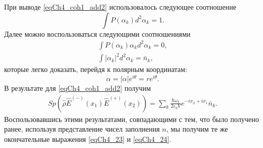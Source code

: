 При выводе \eqref{eqCh4_coh1_add2} использовалось следующее
соотношение
\[
\int 
P\left(\alpha_{k}\right)
d^2 \alpha_{k} = 1.
\]
Далее можно воспользоваться следующими соотношениями
\begin{eqnarray}
\int P\left(\alpha_k\right)\alpha_k d^2\alpha_k = 0,
\nonumber \\
\int \left|\alpha_k\right|^2 d^2\alpha_k = \bar{n}_k,
\nonumber
\end{eqnarray}
которые легко доказать, перейдя к полярным координатам:
\begin{equation}
\alpha = \left|\alpha\right|e^{i\theta} = r e^{i\theta}.
\nonumber
\end{equation}
В результате для \eqref{eqCh4_coh1_add2} получим
\begin{eqnarray}
Sp \left(
\hat{\rho}\hat{E}^{(-)}\left(x_1\right)
\hat{E}^{(+)}\left(x_2\right)
\right) = 
\sum_k 
\frac{\hbar\omega_{k}}{2 \varepsilon_0 V}
e^{-i x_2 + i x_1}
\bar{n}_k.
\nonumber
\end{eqnarray}
Воспользовавшись этими результатами, совпадающими с тем, что было
получено ранее, используя представление чисел заполнения $n$, мы
получим те же окончательные выражения \eqref{eqCh4_23} и
\eqref{eqCh4_24}. 
